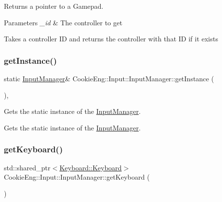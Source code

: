 Returns a pointer to a Gamepad. 


\begin{DoxyParams}{Parameters}
{\em \+\_\+id} & The controller to get\\
\hline
\end{DoxyParams}
Takes a controller ID and returns the controller with that ID if it exists \mbox{\label{class_cookie_eng_1_1_input_1_1_input_manager_a0ae972a3fda8747b2b9cc6bb9417dfa8}} 
\subsubsection{\texorpdfstring{get\+Instance()}{getInstance()}}
{\footnotesize\ttfamily static \hyperlink{class_cookie_eng_1_1_input_1_1_input_manager}{Input\+Manager}\& Cookie\+Eng\+::\+Input\+::\+Input\+Manager\+::get\+Instance (\begin{DoxyParamCaption}{ }\end{DoxyParamCaption})\hspace{0.3cm}{\ttfamily [inline]}, {\ttfamily [static]}}



Gets the static instance of the \hyperlink{class_cookie_eng_1_1_input_1_1_input_manager}{Input\+Manager}. 

Gets the static instance of the \hyperlink{class_cookie_eng_1_1_input_1_1_input_manager}{Input\+Manager}. \mbox{\label{class_cookie_eng_1_1_input_1_1_input_manager_afc8c29f4a07a98ea6599e5f421115361}} 
\subsubsection{\texorpdfstring{get\+Keyboard()}{getKeyboard()}}
{\footnotesize\ttfamily std\+::shared\+\_\+ptr$<$\hyperlink{class_cookie_eng_1_1_input_1_1_keyboard_1_1_keyboard}{Keyboard\+::\+Keyboard}$>$ Cookie\+Eng\+::\+Input\+::\+Input\+Manager\+::get\+Keyboard (\begin{DoxyParamCaption}{ }\end{DoxyParamCaption})\hspace{0.3cm}{\ttfamily [inline]}}



